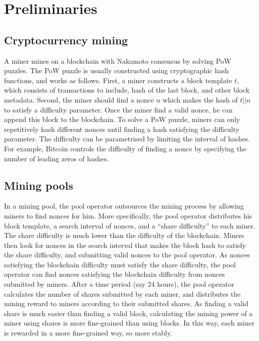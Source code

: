 \section{Preliminaries}
\label{sec:preliminaries}

\subsection{Cryptocurrency mining}


A miner mines on a blockchain with Nakamoto consensus by solving PoW puzzles.
The PoW puzzle is usually constructed using cryptographic hash functions, and works as follows.
First, a miner constructs a block template $t$, which consists of transactions to include, hash of the last block, and other block metadata.
Second, the miner should find a nonce $n$ which makes the hash of $t || n$ to satisfy a difficulty parameter.
Once the miner find a valid nonce, he can append this block to the blockchain.
To solve a PoW puzzle, miners can only repetitively hash different nonces until finding a hash satisfying the difficulty parameter.
The difficulty can be parametrised by limiting the interval of hashes.
For example, Bitcoin controls the difficulty of finding a nonce by specifying the number of leading zeros of hashes.





\subsection{Mining pools}

In a mining pool, the pool operator outsources the mining process by allowing miners to find nonces for him.
More specifically, the pool operator distributes his block template, a search interval of nonces, and a ``share difficulty'' to each miner.
The share difficulty is much lower than the difficulty of the blockchain.
Miners then look for nonces in the search interval that makes the block hash to satisfy the share difficulty, and submitting valid nonces to the pool operator.
As nonces satisfying the blockchain difficulty must satisfy the share difficulty, the pool operator can find nonces satisfying the blockchain difficulty from nonces submitted by miners.
After a time period (say 24 hours), the pool operator calculates the number of shares submitted by each miner, and distributes the mining reward to miners according to their submitted shares.
As finding a valid share is much easier than finding a valid block, calculating the mining power of a miner using shares is more fine-grained than using blocks.
In this way, each miner is rewarded in a more fine-grained way, so more stably.




